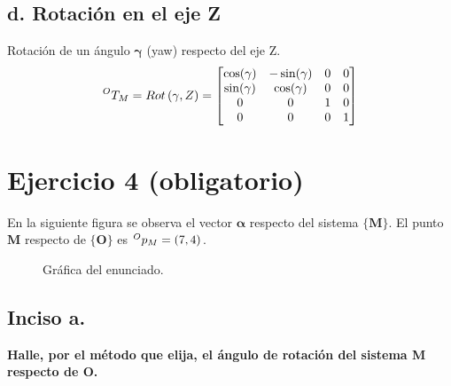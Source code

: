 \documentclass[a4paper,12pt]{article}
\begin{document}
\subsection{d. Rotación en el eje Z}

Rotación de un ángulo $\mathbf{\gamma}$ (yaw) respecto del eje Z.
\begin{equation*}
    \prescript{O}{}{T_M} = Rot\left(\gamma, Z\right) = 
    \begin{bmatrix}
        \cos(\gamma) & -\sin(\gamma) & 0 & 0 \\
        \sin(\gamma) & \cos(\gamma)  & 0 & 0 \\
        0            & 0             & 1 & 0 \\
        0            & 0             & 0 & 1
    \end{bmatrix}
\end{equation*}

\section{Ejercicio 4 (obligatorio)}
En la siguiente figura se observa el vector $\mathbf{\alpha}$ respecto del sistema $\mathbf{\{M\}}$.
El punto $\mathbf{M}$ respecto de $\mathbf{\{O\}}$ es $\prescript{O}{}{p_M} = \left(7,4\right) $.

\begin{figure}[H]
    \centering
    \begin{adjustbox}{scale = 0.85, max width=\columnwidth}
    \end{adjustbox}
    \caption{Gráfica del enunciado.}
\end{figure}

\subsection{Inciso a.}
\textbf{Halle, por el método que elija, el ángulo de rotación del sistema {M} respecto de {O}.}
\vspace{0.5 cm}
\end{document}
